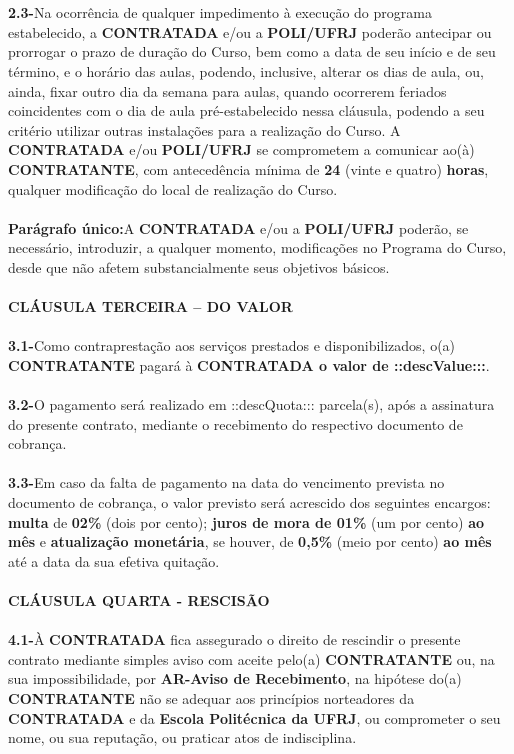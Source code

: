 \documentclass[a4paper,7.5pt]{article}
\begin{document}
\\\\
{\bf2.3-}\indent Na ocorrência de qualquer impedimento à execução do programa estabelecido, a {\bf CONTRATADA} e/ou a {\bf POLI/UFRJ} poderão antecipar ou prorrogar o prazo de duração do Curso, bem como a data de seu início e de seu término, e o horário das aulas, podendo, inclusive, alterar os dias de aula, ou, ainda, fixar outro dia da semana para aulas, quando ocorrerem feriados coincidentes com o dia de aula pré-estabelecido nessa cláusula, podendo a seu critério utilizar outras instalações para a realização do Curso. A {\bf CONTRATADA} e/ou {\bf POLI/UFRJ} se comprometem a comunicar ao(à) {\bf CONTRATANTE}, com antecedência mínima de {\bf 24} (vinte e quatro) {\bf horas}, qualquer modificação do local de realização do Curso.
\\\\
{\bf Parágrafo único:}\indent A {\bf CONTRATADA} e/ou a {\bf POLI/UFRJ} poderão, se necessário, introduzir, a qualquer momento, modificações no Programa do \indent\indent\indent\indent\indent Curso, desde que não afetem substancialmente seus objetivos básicos.
\\\\
{\bf CLÁUSULA TERCEIRA – DO VALOR}
\\\\
{\bf3.1-}\indent Como contraprestação aos serviços prestados e disponibilizados, o(a) {\bf CONTRATANTE} pagará à {\bf CONTRATADA o valor de ::descValue:::}.
\\\\
{\bf3.2-}\indent O pagamento será realizado em ::descQuota::: parcela(s), após a assinatura do presente contrato, mediante o recebimento do respectivo documento de cobrança.
\\\\
{\bf3.3-}\indent Em caso da falta de pagamento na data do vencimento prevista no documento de cobrança, o valor previsto será acrescido dos seguintes encargos: {\bf multa} de {\bf 02\%} (dois por cento); {\bf juros de mora de 01\%} (um por cento) {\bf ao mês} e {\bf atualização monetária}, se houver, de {\bf0,5\%} (meio por cento) {\bf ao mês} até a data da sua efetiva quitação.
\\\\
{\bf CLÁUSULA QUARTA - RESCISÃO}
\\\\
{\bf4.1-}\indent À {\bf CONTRATADA} fica assegurado o direito de rescindir o presente contrato mediante simples aviso com aceite pelo(a) {\bf CONTRATANTE} ou, na sua impossibilidade, por {\bf AR-Aviso de Recebimento}, na hipótese do(a) {\bf CONTRATANTE} não se adequar aos princípios norteadores da {\bf CONTRATADA} e da {\bf Escola Politécnica da UFRJ}, ou comprometer o seu nome, ou sua reputação, ou praticar atos de indisciplina.
\end{document}
